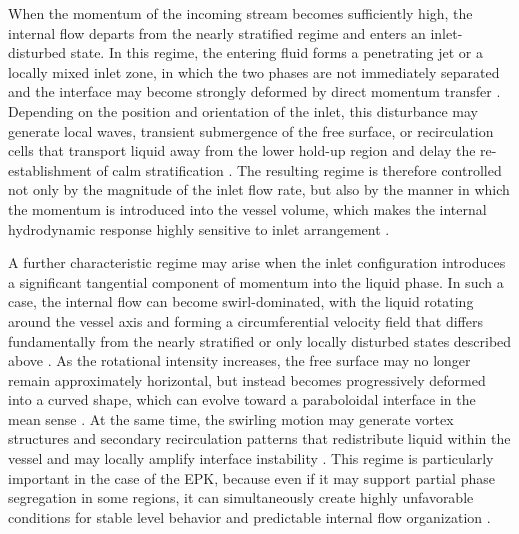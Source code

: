 When the momentum of the incoming stream becomes sufficiently high, the internal flow departs from the nearly stratified regime and enters an inlet-disturbed state. In this regime, the entering fluid forms a penetrating jet or a locally mixed inlet zone, in which the two phases are not immediately separated and the interface may become strongly deformed by direct momentum transfer \cite{LeeEtAl2019,HarunEtAl2019}. Depending on the position and orientation of the inlet, this disturbance may generate local waves, transient submergence of the free surface, or recirculation cells that transport liquid away from the lower hold-up region and delay the re-establishment of calm stratification \cite{LeeEtAl2019,IshiiHibiki2011}. The resulting regime is therefore controlled not only by the magnitude of the inlet flow rate, but also by the manner in which the momentum is introduced into the vessel volume, which makes the internal hydrodynamic response highly sensitive to inlet arrangement \cite{LeeEtAl2019,IshiiHibiki2011}.

A further characteristic regime may arise when the inlet configuration introduces a significant tangential component of momentum into the liquid phase. In such a case, the internal flow can become swirl-dominated, with the liquid rotating around the vessel axis and forming a circumferential velocity field that differs fundamentally from the nearly stratified or only locally disturbed states described above \cite{CarusoEtAl2016,CristofanoEtAl2014}. As the rotational intensity increases, the free surface may no longer remain approximately horizontal, but instead becomes progressively deformed into a curved shape, which can evolve toward a paraboloidal interface in the mean sense \cite{CarusoEtAl2016,CristofanoEtAl2014}. At the same time, the swirling motion may generate vortex structures and secondary recirculation patterns that redistribute liquid within the vessel and may locally amplify interface instability \cite{IshiiHibiki2011,CarusoEtAl2016}. This regime is particularly important in the case of the EPK, because even if it may support partial phase segregation in some regions, it can simultaneously create highly unfavorable conditions for stable level behavior and predictable internal flow organization \cite{CristofanoEtAl2014,IshiiHibiki2011}.

